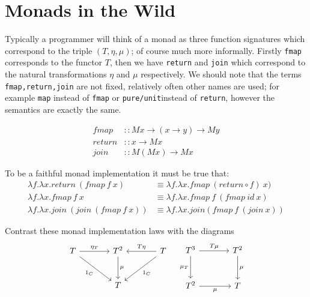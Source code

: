 \section{Monads in the Wild}
Typically a programmer will think of a monad as three function signatures
which correspond to the triple $(T,\eta,\mu)$;
of course much more informally.
Firstly \texttt{fmap} corresponds to the functor $T$,
then we have \texttt{return} and \texttt{join} which correspond to
the natural transformations $\eta$ and $\mu$ respectively.
We should note that the terms \texttt{fmap,return,join}
are not fixed, relatively often other names are used;
for example \texttt{map} instead of \texttt{fmap}
or \texttt{pure/unit}instead of \texttt{return},
however the semantics are exactly the same.

\begin{equation}
  \begin{split}
    fmap   &:: M x \rightarrow (x \rightarrow y) \rightarrow M y \\
    return &:: x \rightarrow M x                                 \\
    join   &:: M (M x) \rightarrow M x
  \end{split}
\end{equation}

To be a faithful monad implementation it must be true that:
\begin{equation}
  \begin{split}
      \lambda f.\lambda x.return\ (fmap\ f\ x)
      &\equiv
      \lambda f.\lambda x.fmap\ (return \circ f)\ x)
      \\
      \lambda f.\lambda x.fmap\ f\ x
      &\equiv
      \lambda f.\lambda x.fmap\ f\ (fmap\ id\ x)
      \\
      \lambda f.\lambda x.join\ (join\ (fmap\ f\ x))
      &\equiv
      \lambda f.\lambda x.join(fmap\ f\ (join\ x))
  \end{split}
\end{equation}

Contrast these monad implementation laws with the diagrams
\begin{equation}
    \begin{tikzcd}[sep=large]
        T \rar{\eta_T} \drar[swap]{1_{C}} & T^2 \dar{\mu} & \lar[swap]{T\eta} \dlar{1_{C}} T \\
                                           & T            &
    \end{tikzcd}
    \quad
    \begin{tikzcd}[sep=large]
        T^3 \rar{T\mu} \dar[swap]{\mu_T} & T^2 \dar{\mu} \\
        T^2 \rar[swap]{\mu}                    & T
    \end{tikzcd}
\end{equation}

